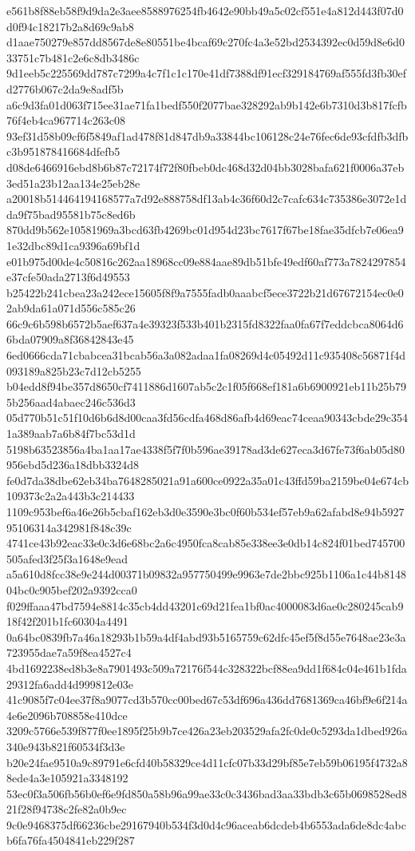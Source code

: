 {e561b8f88eb58f9d9da2e3aee8588976254fb4642e90bb49a5c02cf551e4a812d443f07d0d0f94c18217b2a8d69c9ab8
d1aae750279e857dd8567de8e80551be4bcaf69c270fc4a3e52bd2534392ec0d59d8e6d033751c7b481c2e6c8db3486c
9d1eeb5c225569dd787c7299a4c7f1c1c170e41df7388df91ecf329184769af555fd3fb30efd2776b067c2da9e8adf5b
a6c9d3fa01d063f715ee31ae71fa1bedf550f2077bae328292ab9b142e6b7310d3b817fcfb76f4eb4ca967714c263c08
93ef31d58b09cf6f5849af1ad478f81d847db9a33844bc106128c24e76fec6de93cfdfb3dfbc3b951878416684dfefb5
d08de6466916ebd8b6b87c72174f72f80fbeb0dc468d32d04bb3028bafa621f0006a37eb3ed51a23b12aa134e25eb28e
a20018b514464194168577a7d92e888758df13ab4c36f60d2c7cafc634c735386e3072e1dda9f75bad95581b75c8ed6b
870dd9b562e10581969a3bcd63fb4269bc01d954d23bc7617f67be18fae35dfcb7e06ea91e32dbc89d1ca9396a69bf1d
e01b975d00de4c50816c262aa18968cc09e884aae89db51bfe49edf60af773a7824297854e37cfe50ada2713f6d49553
b25422b241cbea23a242ece15605f8f9a7555fadb0aaabcf5ece3722b21d67672154ec0e02ab9da61a071d556c585c26
66c9c6b598b6572b5aef637a4e39323f533b401b2315fd8322faa0fa67f7eddcbca8064d66bda07909a8f36842843e45
6ed0666cda71cbabcea31bcab56a3a082adaa1fa08269d4c05492d11c935408c56871f4d093189a825b23c7d12cb5255
b04edd8f94be357d8650cf7411886d1607ab5c2c1f05f668ef181a6b6900921eb11b25b795b256aad4abaec246c536d3
05d770b51c51f10d6b6d8d00caa3fd56cdfa468d86afb4d69eac74ceaa90343cbde29c3541a389aab7a6b84f7bc53d1d
5198b63523856a4ba1aa17ae4338f5f7f0b596ae39178ad3de627eca3d67fe73f6ab05d80956ebd5d236a18dbb3324d8
fe0d7da38dbe62eb34ba7648285021a91a600ce0922a35a01c43ffd59ba2159be04e674cb109373c2a2a443b3c214433
1109c953bef6a46e26b5cbaf162eb3d0e3590e3bc0f60b534ef57eb9a62afabd8e94b592795106314a342981f848c39c
4741ce43b92eac33e0c3d6e68bc2a6c4950fca8cab85e338ee3e0db14c824f01bed745700505afed3f25f3a1648e9ead
a5a610d8fcc38e9e244d00371b09832a957750499e9963e7de2bbc925b1106a1c44b814804bc0c905bef202a9392cca0
f029ffaaa47bd7594e8814c35cb4dd43201c69d21fea1bf0ac4000083d6ae0c280245cab918f42f201b1fc60304a4491
0a64bc0839fb7a46a18293b1b59a4df4abd93b5165759c62dfc45ef5f8d55e7648ae23e3a723955dae7a59f8ea4527c4
4bd1692238ed8b3e8a7901493c509a72176f544c328322bcf88ea9dd1f684c04e461b1fda29312fa6add4d999812e03e
41c9085f7c04ee37f8a9077cd3b570cc00bed67c53df696a436dd7681369ca46bf9e6f214a4e6e2096b708858e410dce
3209c5766e539f877f0ee1895f25b9b7ce426a23eb203529afa2fc0de0c5293da1dbed926a340e943b821f60534f3d3e
b20e24fae9510a9c89791e6cfd40b58329ce4d11cfc07b33d29bf85e7eb59b06195f4732a88ede4a3e105921a3348192
53ec0f3a506fb56b0ef6e9fd850a58b96a99ae33c0c3436bad3aa33bdb3c65b0698528ed821f28f94738c2fe82a0b9ec
9c0e9468375df66236cbe29167940b534f3d0d4c96aceab6dcdeb4b6553ada6de8dc4abcb6fa76fa4504841eb229f287
}

